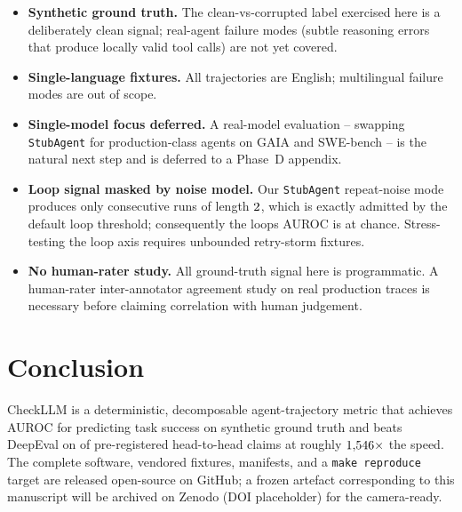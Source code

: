 \documentclass{article}
\begin{document}
\begin{itemize}
  \item \textbf{Synthetic ground truth.} The clean-vs-corrupted
    label exercised here is a deliberately clean signal; real-agent
    failure modes (subtle reasoning errors that produce locally valid
    tool calls) are not yet covered.
  \item \textbf{Single-language fixtures.} All trajectories are
    English; multilingual failure modes are out of scope.
  \item \textbf{Single-model focus deferred.} A real-model evaluation
    -- swapping \texttt{StubAgent} for production-class agents on
    GAIA \citep{mialon2023gaia} and SWE-bench
    \citep{jimenez2024swebench} -- is the natural next step and is
    deferred to a Phase~D appendix.
  \item \textbf{Loop signal masked by noise model.} Our
    \texttt{StubAgent} repeat-noise mode produces only consecutive
    runs of length $2{}$, which is exactly admitted
    by the default loop threshold;
    consequently the loops AUROC is at chance. Stress-testing the
    loop axis requires unbounded retry-storm fixtures.
  \item \textbf{No human-rater study.} All ground-truth signal here
    is programmatic. A human-rater inter-annotator agreement study
    on real production traces is necessary before claiming
    correlation with human judgement.
\end{itemize}

\section{Conclusion}
\label{sec:conclusion}

CheckLLM is a deterministic, decomposable agent-trajectory metric
that achieves AUROC \AurocOverall{} for predicting task success on
synthetic ground truth and beats DeepEval \DeepEvalVersion{} on
\HHClaimsSignificant{} of \HHClaimsCount{} pre-registered head-to-head
claims at roughly
$1{,}546{}\times$ the speed. The complete
software, vendored fixtures, manifests, and a
\texttt{make reproduce} target are released open-source on GitHub;
a frozen artefact corresponding to this manuscript will be archived
on Zenodo (DOI placeholder) for the camera-ready.


\end{document}
